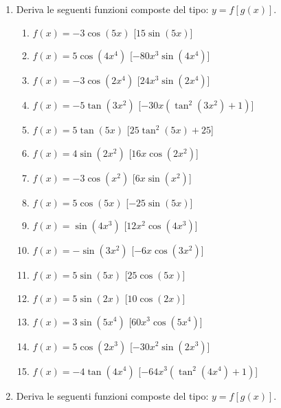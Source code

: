 \begin{enumerate}
\item Deriva le seguenti funzioni composte del tipo: \(y=f[g(x)]\).

\begin{enumerate}
\item \(f(x) = - 3 \cos{\left (5 x \right )}\) \hfill [\(15 \sin{\left (5 x 
\right )}\)]
\item \(f(x) = 5 \cos{\left (4 x^{4} \right )}\) \hfill [\(- 80 x^{3} \sin{\left 
(4 x^{4} \right )}\)]
\item \(f(x) = - 3 \cos{\left (2 x^{4} \right )}\) \hfill [\(24 x^{3} \sin{\left 
(2 x^{4} \right )}\)]
\item \(f(x) = - 5 \tan{\left (3 x^{2} \right )}\) \hfill [\(- 30 x 
\left(\tan^{2}{\left (3 x^{2} \right )} + 1\right)\)]
\item \(f(x) = 5 \tan{\left (5 x \right )}\) \hfill [\(25 \tan^{2}{\left (5 x 
\right )} + 25\)]
\item \(f(x) = 4 \sin{\left (2 x^{2} \right )}\) \hfill [\(16 x \cos{\left (2 
x^{2} \right )}\)]
\item \(f(x) = - 3 \cos{\left (x^{2} \right )}\) \hfill [\(6 x \sin{\left (x^{2} 
\right )}\)]
\item \(f(x) = 5 \cos{\left (5 x \right )}\) \hfill [\(- 25 \sin{\left (5 x 
\right )}\)]
\item \(f(x) = \sin{\left (4 x^{3} \right )}\) \hfill [\(12 x^{2} \cos{\left (4 
x^{3} \right )}\)]
\item \(f(x) = - \sin{\left (3 x^{2} \right )}\) \hfill [\(- 6 x \cos{\left (3 
x^{2} \right )}\)]
\item \(f(x) = 5 \sin{\left (5 x \right )}\) \hfill [\(25 \cos{\left (5 x \right 
)}\)]
\item \(f(x) = 5 \sin{\left (2 x \right )}\) \hfill [\(10 \cos{\left (2 x \right 
)}\)]
\item \(f(x) = 3 \sin{\left (5 x^{4} \right )}\) \hfill [\(60 x^{3} \cos{\left 
(5 x^{4} \right )}\)]
\item \(f(x) = 5 \cos{\left (2 x^{3} \right )}\) \hfill [\(- 30 x^{2} \sin{\left 
(2 x^{3} \right )}\)]
\item \(f(x) = - 4 \tan{\left (4 x^{4} \right )}\) \hfill [\(- 64 x^{3} 
\left(\tan^{2}{\left (4 x^{4} \right )} + 1\right)\)]
 \end{enumerate}


\item Deriva le seguenti funzioni composte del tipo: \(y=f[g(x)]\).


\end{enumerate}
